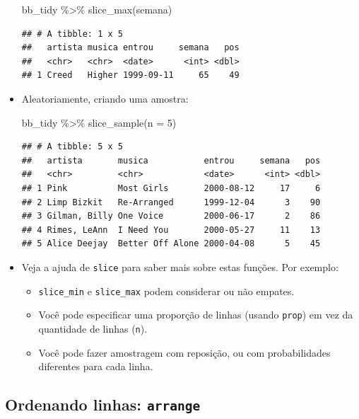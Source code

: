 \documentclass[
  11pt]{report}
\newenvironment{Shaded}{\begin{snugshade}}{\end{snugshade}}
\newcommand{\AttributeTok}[1]{\textcolor[rgb]{0.77,0.63,0.00}{#1}}
\newcommand{\DecValTok}[1]{\textcolor[rgb]{0.00,0.00,0.81}{#1}}
\newcommand{\FunctionTok}[1]{\textcolor[rgb]{0.00,0.00,0.00}{#1}}
\newcommand{\NormalTok}[1]{#1}
\newcommand{\SpecialCharTok}[1]{\textcolor[rgb]{0.00,0.00,0.00}{#1}}
\renewenvironment{Shaded}{
    \begin{mdframed}[%
      roundcorner=2pt,%
      innerleftmargin=5pt,%
      innerrightmargin=5pt,%
      topline=true,%
      leftline=true,%
      rightline=true,%
      bottomline=true,%
      linewidth=0.5pt,%
      linecolor=black!20,%
      backgroundcolor=black!2,%
      skipabove=2ex,%
      skipbelow=2.5ex%
    ]%
  }
  {
    \end{mdframed}
  }
\begin{document}
\begin{itemize}
\begin{Shaded}
\begin{Highlighting}[]
\NormalTok{bb\_tidy }\SpecialCharTok{\%\textgreater{}\%} 
  \FunctionTok{slice\_max}\NormalTok{(semana)}
\end{Highlighting}
\end{Shaded}

\begin{verbatim}
## # A tibble: 1 x 5
##   artista musica entrou     semana   pos
##   <chr>   <chr>  <date>      <int> <dbl>
## 1 Creed   Higher 1999-09-11     65    49
\end{verbatim}
\item
  Aleatoriamente, criando uma amostra:

\begin{Shaded}
\begin{Highlighting}[]
\NormalTok{bb\_tidy }\SpecialCharTok{\%\textgreater{}\%} 
  \FunctionTok{slice\_sample}\NormalTok{(}\AttributeTok{n =} \DecValTok{5}\NormalTok{)}
\end{Highlighting}
\end{Shaded}

\begin{verbatim}
## # A tibble: 5 x 5
##   artista       musica           entrou     semana   pos
##   <chr>         <chr>            <date>      <int> <dbl>
## 1 Pink          Most Girls       2000-08-12     17     6
## 2 Limp Bizkit   Re-Arranged      1999-12-04      3    90
## 3 Gilman, Billy One Voice        2000-06-17      2    86
## 4 Rimes, LeAnn  I Need You       2000-05-27     11    13
## 5 Alice Deejay  Better Off Alone 2000-04-08      5    45
\end{verbatim}
\item
  Veja a ajuda de \texttt{slice} para saber mais sobre estas funções. Por exemplo:

  \begin{itemize}
  \item
    \texttt{slice\_min} e \texttt{slice\_max} podem considerar ou não empates.
  \item
    Você pode especificar uma proporção de linhas (usando \texttt{prop}) em vez da quantidade de linhas (\texttt{n}).
  \item
    Você pode fazer amostragem com reposição, ou com probabilidades diferentes para cada linha.
  \end{itemize}
\end{itemize}

\hypertarget{ordenando-linhas-arrange}{%
\subsection{\texorpdfstring{Ordenando linhas: \texttt{arrange}}{Ordenando linhas: arrange}}\label{ordenando-linhas-arrange}}
\end{document}
